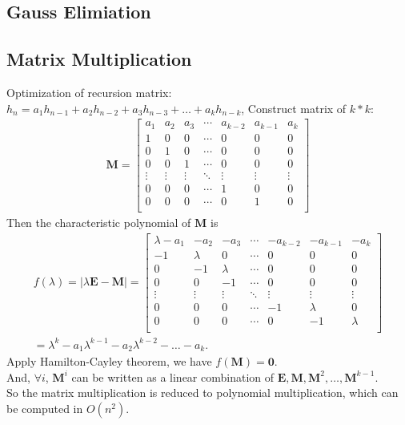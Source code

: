 ﻿\documentclass[10pt]{article}
\begin{document}
\subsection{Gauss Elimiation}

\subsection{Matrix Multiplication}

Optimization of recursion matrix: \\
$h_n=a_1h_{n-1}+a_2h_{n-2}+a_3h_{n-3}+ \ldots + a_kh_{n-k}$, Construct matrix of $k*k$:
\begin{gather*}
\mathbf{M} =
\begin{bmatrix}
a_1 & a_2 & a_3 & \cdots & a_{k-2} & a_{k-1} & a_k \\
1 & 0 & 0 & \cdots & 0 & 0 & 0 \\
0 & 1 & 0 & \cdots & 0 & 0 & 0 \\
0 & 0 & 1 & \cdots & 0 & 0 & 0 \\
\vdots & \vdots & \vdots & \ddots & \vdots & \vdots & \vdots \\
0 & 0 & 0 & \cdots & 1 & 0 & 0 \\
0 & 0 & 0 & \cdots & 0 & 1 & 0 \\
\end{bmatrix}
\end{gather*}
Then the characteristic polynomial of $\mathbf{M}$ is
\begin{gather*}
f(\lambda)=|\lambda \mathbf{E} - \mathbf{M}| =
\begin{bmatrix}
\lambda - a_1 & -a_2 & -a_3 & \cdots & -a_{k-2} & -a_{k-1} & -a_k \\
-1 & \lambda & 0 & \cdots & 0 & 0 & 0 \\
0 & -1 & \lambda & \cdots & 0 & 0 & 0 \\
0 & 0 & -1 & \cdots & 0 & 0 & 0 \\
\vdots & \vdots & \vdots & \ddots & \vdots & \vdots & \vdots \\
0 & 0 & 0 & \cdots & -1 & \lambda & 0 \\
0 & 0 & 0 & \cdots & 0 & -1 & \lambda \\
\end{bmatrix}
\\
=\lambda ^k - a_1 \lambda ^ {k-1} - a_2 \lambda ^ {k-2} - \ldots - a_k.
\end{gather*}
Apply Hamilton-Cayley theorem, we have $f(\mathbf{M})=\mathbf{0}$. \\
And, $\forall i$, $\mathbf{M} ^ i$ can be written as a linear combination of $\mathbf{E},\mathbf{M},\mathbf{M} ^2, \ldots, \mathbf{M} ^ {k-1}$.\\
So the matrix multiplication is reduced to polynomial multiplication, which can be computed in $O(n^2)$.
\end{document}
